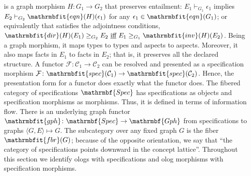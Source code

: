 \documentclass{amsart}
\theoremstyle{remark}
\theoremstyle{definition}
\begin{document}
is a graph morphism $H \colon G_{1} \rightarrow G_{2}$ that preserves entailment:
$E_{1} \vdash_{G_{1}} \epsilon_{1}$ implies $E_{2} \vdash_{G_{2}} \mathrmbfit{eqn}(H)(\epsilon_{1})$
for any $\epsilon_{1} \in \mathrmbfit{eqn}(G_{1})$;
or equivalently
that satisfies the adjointness conditions,
$\mathrmbfit{dir}(H)(E_{1}) \geq_{G_{2}} E_{2}
\text{ \underline{iff} } 
E_{1} \geq_{G_{1}} \mathrmbfit{inv}(H)(E_{2})$.
Being a graph morphism, 
it maps types to types and aspects to aspects.
Moreover, 
it also maps facts in $E_{1}$ to facts in $E_{2}$;
that is, it preserves all the declared structure. 
%
%
A functor $\mathcal{F} \colon \mathcal{C}_{1} \rightarrow \mathcal{C}_{2}$
can be resolved and presented as a specification morphism 
$\mathcal{F} \colon \mathrmbfit{spec}(\mathcal{C}_{1}) \rightarrow \mathrmbfit{spec}(\mathcal{C}_{2})$. 
Hence, the presentation form for a functor does exactly what the functor does.
%
The fibered category of specifications $\mathrmbf{Spec}$
has specifications as objects and specification morphisms as morphisms.
Thus,
it is defined in terms of information flow.
There is an underlying graph functor
$\mathrmbfit{gph} \colon \mathrmbf{Spec} \rightarrow \mathrmbf{Gph}$ from specifications to graphs 
${\langle{G,E}\rangle} \mapsto G$.
The subcategory over any fixed graph $G$ is the fiber $\mathrmbfit{fbr}(G)$;
because of the opposite orientation,
we say that
``the category of specifications points downward in the concept lattice''. 
%
Throughout this section we identify ologs with specifications and olog morphisms with specification morphisms.
\end{document}
